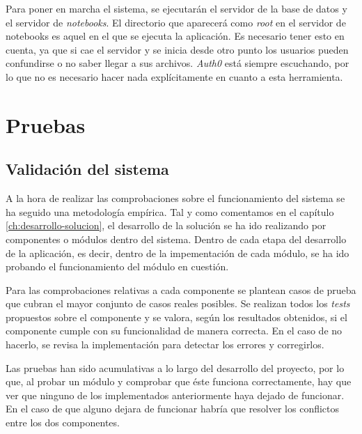 \documentclass[11pt,spanish,listoffigures]{tfgetsinf}
\begin{document}
Para poner en marcha el sistema, se ejecutarán el servidor de la base de datos y el servidor de \textit{notebooks}. El directorio que aparecerá como \textit{root} en el servidor de notebooks es aquel en el que se ejecuta la aplicación. Es necesario tener esto en cuenta, ya que si cae el servidor y se inicia desde otro punto los usuarios pueden confundirse o no saber llegar a sus archivos. \textit{Auth0} está siempre escuchando, por lo que no es necesario hacer nada explícitamente en cuanto a esta herramienta. 





\chapter{Pruebas}
\label{ch:pruebas}



\section{Validación del sistema}
\label{sec:validacion-sistema}

A la hora de realizar las comprobaciones sobre el funcionamiento del sistema se ha seguido una metodología empírica. Tal y como comentamos en el capítulo \ref{ch:desarrollo-solucion}, el desarrollo de la solución se ha ido realizando por componentes o módulos dentro del sistema. Dentro de cada etapa del desarrollo de la aplicación, es decir, dentro de la impementación de cada módulo, se ha ido probando el funcionamiento del módulo en cuestión.

Para las comprobaciones relativas a cada componente se plantean casos de prueba que cubran el mayor conjunto de casos reales posibles. Se realizan todos los \textit{tests} propuestos sobre el componente y se valora, según los resultados obtenidos, si el componente cumple con su funcionalidad de manera correcta. En el caso de no hacerlo, se revisa la implementación para detectar los errores y corregirlos.

Las pruebas han sido acumulativas a lo largo del desarrollo del proyecto, por lo que, al probar un módulo y comprobar que éste funciona correctamente, hay que ver que ninguno de los implementados anteriormente haya dejado de funcionar. En el caso de que alguno dejara de funcionar habría que resolver los conflictos entre los dos componentes.
\end{document}
